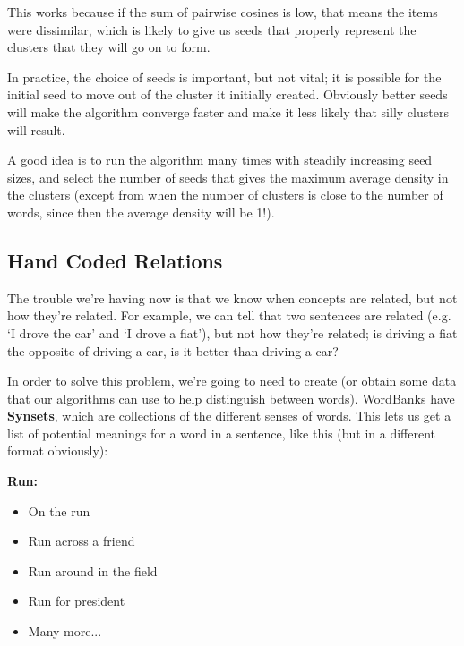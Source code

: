 This works because if the sum of pairwise cosines is low, that means the items
were dissimilar, which is likely to give us seeds that properly represent the
clusters that they will go on to form.

In practice, the choice of seeds is important, but not vital; it is possible for
the initial seed to move out of the cluster it initially created. Obviously
better seeds will make the algorithm converge faster and make it less likely
that silly clusters will result.

A good idea is to run the algorithm many times with steadily increasing seed
sizes, and select the number of seeds that gives the maximum average density in
the clusters (except from when the number of clusters is close to the number of
words, since then the average density will be 1!).

\subsection{Hand Coded Relations}

The trouble we're having now is that we know when concepts are related, but not
how they're related. For example, we can tell that two sentences are related
(e.g. `I drove the car' and `I drove a fiat'), but not how they're related; is
driving a fiat the opposite of driving a car, is it better than driving a car?

In order to solve this problem, we're going to need to create (or obtain some
data that our algorithms can use to help distinguish between words). WordBanks
have \textbf{Synsets}, which are collections of the different senses of words.
This lets us get a list of potential meanings for a word in a sentence, like
this (but in a different format obviously):

\begin{description}
  \item \textbf{Run:}
  \begin{mymulticols}
    \begin{itemize}
      \item On the run
      \item Run across a friend
      \item Run around in the field
      \item Run for president
      \item Many more...
    \end{itemize}
  \end{mymulticols}
\end{description}


